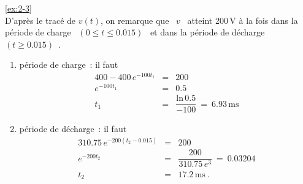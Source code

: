 \begin{solexercise}{\ref{ex:2-3}}
\\
D'apr\`es le trac\'e de $ v(t)$, on remarque que \ $v$ \
atteint 200$\,$V \`a la fois dans la p\'eriode de charge \ $(0 \leq t \leq
0.015)$ \ et dans la p\'eriode de d\'echarge \ $(t \geq 0.015)$~.

\begin{enumerate}
	\item p\'eriode de charge~: il faut
	\begin{eqnarray*}
		400 - 400\, e^{-100t_1} &=& 200\\
		e^{-100t_1} &=& 0.5\\
		t_1 &=& \dfrac{ \mbox{ln}\, 0.5}{-100} \: = \: 6.93\,\mbox{ms}
	\end{eqnarray*}
	\item p\'eriode de d\'echarge~: il faut
	\begin{eqnarray*}
		310.75\, e^{-200(t_2-0.015)} &=& 200\\
		e^{-200t_2} &=& \dfrac{200}{310.75\, e^3} \: = \: 0.03204\\
		t_2 &=& 17.2\,\mbox{ms}~.
	\end{eqnarray*}
\end{enumerate}
\end{solexercise}

